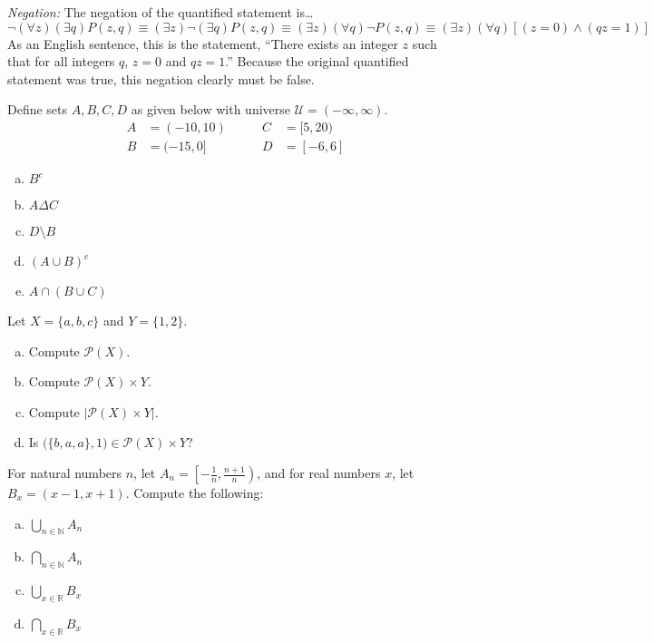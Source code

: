 \documentclass[12pt,letterpaper]{exam}
\begin{document}
\begin{questions}
\begin{enumerate}[(a)]
{\itshape Negation:} The negation of the quantified statement is\dots
	\[
	\neg (\forall z)(\exists q) P(z, q) \equiv (\exists z) \neg (\exists q) P(z, q) \equiv (\exists z) (\forall q) \neg P(z, q) \equiv (\exists z) (\forall q) \left[ (z= 0) \wedge (qz= 1) \right]
	\]
As an English sentence, this is the statement, ``There exists an integer $z$ such that for all integers $q$, $z= 0$ and $qz= 1$.'' Because the original quantified statement was true, this negation clearly must be false. 


\end{enumerate}



\newpage
\question[10] Define sets $A, B, C, D$ as given below with universe $\mathcal{U}= (-\infty, \infty)$. 
	\[
	\begin{aligned}
	A&= (-10, 10) \qquad& C&= [5, 20) \\[0.1cm]
	B&= (-15, 0] & D&= [-6, 6]
	\end{aligned}
	\]

\begin{enumerate}[(a)]
\item $B^c$
\item $A \Delta C$
\item $D \setminus B$
\item $(A \cup B)^c$
\item $A \cap (B \cup C)$
\end{enumerate}



\newpage
\question[10] Let $X= \{ a, b, c \}$ and $Y= \{ 1, 2 \}$. 
	\begin{enumerate}[(a)]
	\item Compute $\mathcal{P}(X)$.
	\item Compute $\mathcal{P}(X) \times Y$. 
	\item Compute $|\mathcal{P}(X) \times Y|$.
	\item Is $\big( \{ b, a, a \}, 1 \big) \in \mathcal{P}(X) \times Y$?
	\end{enumerate}



\newpage
\question[10] For natural numbers $n$, let $A_n= \left[ -\frac{1}{n}, \frac{n + 1}{n} \right)$, and for real numbers $x$, let $B_x= (x - 1, x + 1)$. Compute the following:
	\begin{enumerate}[(a)]
	\item $\displaystyle \bigcup_{n \in \mathbb{N}} A_n$
	\item $\displaystyle \bigcap_{n \in \mathbb{N}} A_n$
	\item $\displaystyle \bigcup_{x \in \mathbb{R}} B_x$
	\item $\displaystyle \bigcap_{x \in \mathbb{R}} B_x$
	\end{enumerate}




\end{questions}
\end{document}
